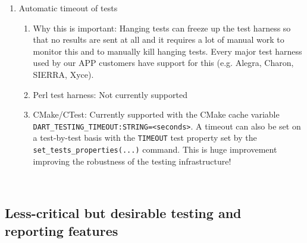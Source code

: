 \documentclass[pdf,ps2pdf,11pt]{SANDreport}
\begin{document}
\begin{enumerate}
{}\item Automatic timeout of tests

  \begin{enumerate}

  {}\item Why this is important: Hanging tests can freeze up the
  test harness so that no results are sent at all and it requires a
  lot of manual work to monitor this and to manually kill hanging
  tests.  Every major test harness used by our APP customers have
  support for this (e.g. Alegra, Charon, SIERRA, Xyce).

  {}\item Perl test harness: Not currently supported

  {}\item CMake/CTest: Currently supported with the CMake cache
  variable {}\texttt{DART\_TESTING\_TIMEOUT:STRING=<seconds>}.  A
  timeout can also be set on a test-by-test basis with the
  {}\texttt{TIMEOUT} test property set by the
  {}\texttt{set\_tests\_properties(...)} command.  This is huge
  improvement improving the robustness of the testing infrastructure!

  \end{enumerate}

\end{enumerate}

\
%
{}\subsection{Less-critical but desirable testing and reporting features}
%
\end{document}
